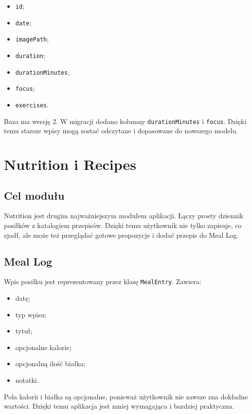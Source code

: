 \documentclass[12pt,a4paper]{article}
\begin{document}
\begin{itemize}
    \item \texttt{id};
    \item \texttt{date};
    \item \texttt{imagePath};
    \item \texttt{duration};
    \item \texttt{durationMinutes};
    \item \texttt{focus};
    \item \texttt{exercises}.
\end{itemize}

Baza ma wersję 2. W migracji dodano kolumny \texttt{durationMinutes} i \texttt{focus}. Dzięki temu starsze wpisy mogą zostać odczytane i dopasowane do nowszego modelu.

\section{Nutrition i Recipes}

\subsection{Cel modułu}

Nutrition jest drugim najważniejszym modułem aplikacji. Łączy prosty dziennik posiłków z katalogiem przepisów. Dzięki temu użytkownik nie tylko zapisuje, co zjadł, ale może też przeglądać gotowe propozycje i dodać przepis do Meal Log.

\subsection{Meal Log}

Wpis posiłku jest reprezentowany przez klasę \texttt{MealEntry}. Zawiera:

\begin{itemize}
    \item datę;
    \item typ wpisu;
    \item tytuł;
    \item opcjonalne kalorie;
    \item opcjonalną ilość białka;
    \item notatki.
\end{itemize}

Pola kalorii i białka są opcjonalne, ponieważ użytkownik nie zawsze zna dokładne wartości. Dzięki temu aplikacja jest mniej wymagająca i bardziej praktyczna.
\end{document}
